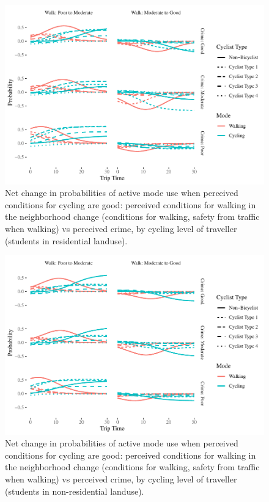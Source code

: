 \documentclass[]{elsarticle} %
\makeatletter
\def\maxwidth{\ifdim\Gin@nat@width>\linewidth\linewidth
\else\Gin@nat@width\fi}
\let\Oldincludegraphics\includegraphics
\renewcommand{\includegraphics}[1]{\Oldincludegraphics[width=\maxwidth]{#1}}
\makeatother
\begin{document}
\begin{figure}
\centering
\includegraphics{Active-Travel-in-Bangladesh_files/figure-latex/figure-comparison-walk-perceptions-change-students-residential-1.pdf}
\caption{\label{fig:comparison-walk-perceptions-change-students-residential}Net
change in probabilities of active mode use when perceived conditions for
cycling are good: perceived conditions for walking in the neighborhood
change (conditions for walking, safety from traffic when walking) vs
perceived crime, by cycling level of traveller (students in residential
landuse).}
\end{figure}

\begin{figure}
\centering
\includegraphics{Active-Travel-in-Bangladesh_files/figure-latex/figure-comparison-walk-perceptions-change-students-non-residential-1.pdf}
\caption{\label{fig:comparison-walk-perceptions-change-students-non-residential}Net
change in probabilities of active mode use when perceived conditions for
cycling are good: perceived conditions for walking in the neighborhood
change (conditions for walking, safety from traffic when walking) vs
perceived crime, by cycling level of traveller (students in
non-residential landuse).}
\end{figure}
\end{document}
